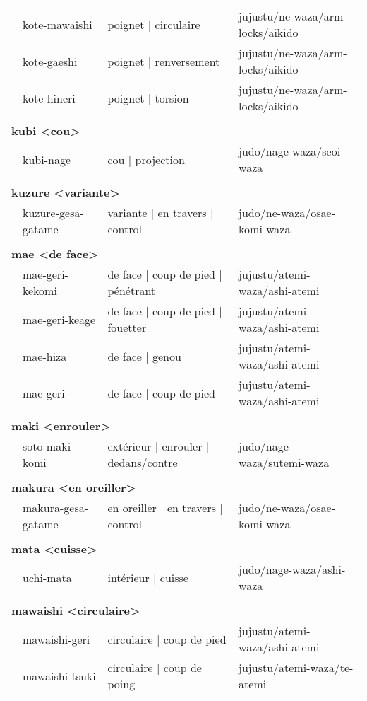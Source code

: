 \documentclass{article}%
\begin{document}
\begin{longtable}{rlll}
&kote{-}mawaishi&poignet | circulaire&jujustu/ne{-}waza/arm{-}locks/aikido\\%
&kote{-}gaeshi&poignet | renversement&jujustu/ne{-}waza/arm{-}locks/aikido\\%
&kote{-}hineri&poignet | torsion&jujustu/ne{-}waza/arm{-}locks/aikido\\%
&&&\\%
\multicolumn{3}{l}{\textbf{kubi <cou>}%
~%
}&\\%
&kubi{-}nage&cou | projection&judo/nage{-}waza/seoi{-}waza\\%
&&&\\%
\multicolumn{3}{l}{\textbf{kuzure <variante>}%
~%
}&\\%
&kuzure{-}gesa{-}gatame&variante | en travers | control&judo/ne{-}waza/osae{-}komi{-}waza\\%
&&&\\%
\multicolumn{3}{l}{\textbf{mae <de face>}%
~%
}&\\%
&mae{-}geri{-}kekomi&de face | coup de pied | pénétrant&jujustu/atemi{-}waza/ashi{-}atemi\\%
&mae{-}geri{-}keage&de face | coup de pied | fouetter&jujustu/atemi{-}waza/ashi{-}atemi\\%
&mae{-}hiza&de face | genou&jujustu/atemi{-}waza/ashi{-}atemi\\%
&mae{-}geri&de face | coup de pied&jujustu/atemi{-}waza/ashi{-}atemi\\%
&&&\\%
\multicolumn{3}{l}{\textbf{maki <enrouler>}%
~%
}&\\%
&soto{-}maki{-}komi&extérieur | enrouler | dedans/contre&judo/nage{-}waza/sutemi{-}waza\\%
&&&\\%
\multicolumn{3}{l}{\textbf{makura <en oreiller>}%
~%
}&\\%
&makura{-}gesa{-}gatame&en oreiller | en travers | control&judo/ne{-}waza/osae{-}komi{-}waza\\%
&&&\\%
\multicolumn{3}{l}{\textbf{mata <cuisse>}%
~%
}&\\%
&uchi{-}mata&intérieur | cuisse&judo/nage{-}waza/ashi{-}waza\\%
&&&\\%
\multicolumn{3}{l}{\textbf{mawaishi <circulaire>}%
~%
}&\\%
&mawaishi{-}geri&circulaire | coup de pied&jujustu/atemi{-}waza/ashi{-}atemi\\%
&mawaishi{-}tsuki&circulaire | coup de poing&jujustu/atemi{-}waza/te{-}atemi\\%

\end{longtable}
\end{document}
